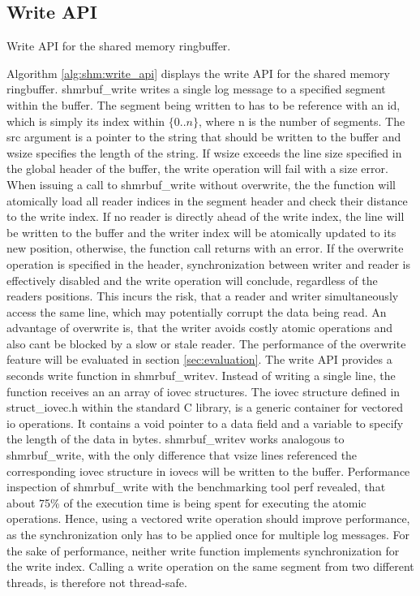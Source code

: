 \subsection{Write API}

\begin{algorithm}[h!]
    
    \label{alg:shm:write_api}
    \caption[Shared Memory Ringbuffer: Write API]{Write API for the shared memory ringbuffer.}
\end{algorithm}

Algorithm \ref{alg:shm:write_api} displays the write API for the shared memory ringbuffer. shmrbuf\_write 
writes a single log message to a specified segment within the buffer. The segment being written to has to be reference with an id, which is simply its index within $\{0..n\}$, where
n is the number of segments. The src argument is a pointer to the string that should be written to the buffer and wsize specifies the length of the string.
If wsize exceeds the line size specified in the global header of the buffer, the write operation will fail with a size error. When issuing a call to shmrbuf\_write without overwrite, the 
the function will atomically load all reader indices in the segment header and check their distance to the write index. If no reader is directly ahead of the write index, the line will be written
to the buffer and the writer index will be atomically updated to its new position, otherwise, the function call returns with an error. If the overwrite operation is specified in the header, synchronization between writer and reader is
effectively disabled and the write operation will conclude, regardless of the readers positions. This incurs the risk, that a reader and writer simultaneously access 
the same line, which may potentially corrupt the data being read. An advantage of overwrite is, that the writer avoids costly atomic operations and also cant be blocked 
by a slow or stale reader. The performance of the overwrite feature will be evaluated in section \ref{sec:evaluation}.
The write API provides a seconds write function in shmrbuf\_writev. Instead of writing a single line, the function receives an  
an array of iovec structures. The iovec structure defined in struct\_iovec.h within the standard C library, is a generic container for vectored
io operations. It contains a void pointer to a data field and a variable to specify the length of the data in bytes. 
shmrbuf\_writev works analogous to shmrbuf\_write, with the only difference that vsize lines referenced the corresponding iovec
structure in iovecs will be written to the buffer. Performance inspection of shmrbuf\_write with the benchmarking tool
perf \cite{perf} revealed, that about 75\% of the execution time is being spent for executing the atomic operations. Hence, 
using a vectored write operation should improve performance, as the synchronization only has to be applied once for multiple log messages.
For the sake of performance, neither write function implements synchronization for the write index. Calling a write operation
on the same segment from two different threads, is therefore not thread-safe.

